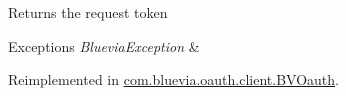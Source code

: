 \begin{DoxyReturn}{Returns}
the request token 
\end{DoxyReturn}

\begin{DoxyExceptions}{Exceptions}
{\em BlueviaException} & \\
\hline
\end{DoxyExceptions}


Reimplemented in \hyperlink{classcom_1_1bluevia_1_1oauth_1_1client_1_1BVOauth_ade519920fd49023170b97938c1ff2d4e}{com.bluevia.oauth.client.BVOauth}.

